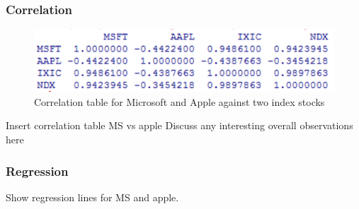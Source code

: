 \documentclass[paper=a4, fontsize=11pt]{scrartcl} %
\numberwithin{equation}{section} %
\numberwithin{figure}{section} %
\numberwithin{table}{section} %
\begin{document}
\subsubsection{Correlation}

\begin{figure}[!htb]
  \includegraphics[width=\linewidth]{graph/cor5.png}
  \caption{Correlation table for Microsoft and Apple against two index stocks}
\endminipage\hfill
\end{figure}

Insert correlation table MS vs apple
Discuss any interesting overall observations here

\subsubsection{Regression}
Show regression lines for MS and apple. 
\end{document}
